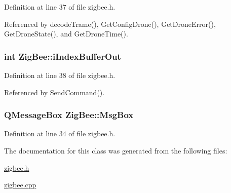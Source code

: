 Definition at line 37 of file zigbee.\-h.



Referenced by decode\-Trame(), Get\-Config\-Drone(), Get\-Drone\-Error(), Get\-Drone\-State(), and Get\-Drone\-Time().

\hypertarget{classZigBee_aa510069113962d7a107f27c4d798d08c}{
\subsubsection[{i\-Index\-Buffer\-Out}]{\setlength{\rightskip}{0pt plus 5cm}int Zig\-Bee\-::i\-Index\-Buffer\-Out\hspace{0.3cm}{\ttfamily [private]}}}\label{classZigBee_aa510069113962d7a107f27c4d798d08c}


Definition at line 38 of file zigbee.\-h.



Referenced by Send\-Command().

\hypertarget{classZigBee_a7048223c8f5546e3614641cba1062357}{
\subsubsection[{Msg\-Box}]{\setlength{\rightskip}{0pt plus 5cm}Q\-Message\-Box Zig\-Bee\-::\-Msg\-Box\hspace{0.3cm}{\ttfamily [private]}}}\label{classZigBee_a7048223c8f5546e3614641cba1062357}


Definition at line 34 of file zigbee.\-h.



The documentation for this class was generated from the following files\-:\begin{DoxyCompactItemize}
\item 
\hyperlink{zigbee_8h}{zigbee.\-h}\item 
\hyperlink{zigbee_8cpp}{zigbee.\-cpp}\end{DoxyCompactItemize}
